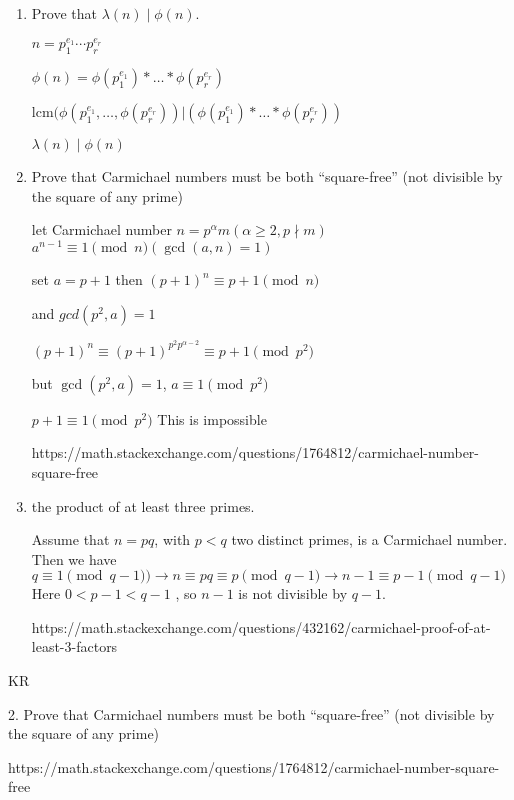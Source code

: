\begin{enumerate}
    \item  Prove that $\lambda(n) \mid \phi(n)$.
    
    $n = p_1^{e_1} \cdots p_r^{e_r}$

    $ \phi(n) = \phi(p_1^{e_1})* \ldots*\phi(p_r^{e_r})$

    $\text{lcm}(\phi(p_1^{e_1}, \ldots, \phi(p_r^{e_r})) | (\phi(p_1^{e_1})* \ldots*\phi(p_r^{e_r}))$
    
    $\lambda(n) \mid \phi(n)$

    \item  Prove that Carmichael numbers must be both “square-free” (not divisible by the square of any prime) 

    let Carmichael number $n = p^\alpha m( \alpha \ge 2 ,  p \nmid m )$
    $a^{n-1} \equiv 1 \pmod{n} (\gcd(a,n) = 1)$
    
    set $a = p+1 $ then $(p+1)^{n} \equiv p+1 \pmod{n}$
    
    and $gcd(p^2,a) = 1$
    
    $(p+1)^{n} \equiv (p+1)^{p^2 p^{\alpha-2}} \equiv p+1 \pmod{p^2}$
    
    but $\gcd(p^2,a) = 1$,  $ a \equiv 1 \pmod{p^2}$
    
    $p+1 \equiv 1 \pmod{p^2}$ This is impossible
    
    https://math.stackexchange.com/questions/1764812/carmichael-number-square-free


    
    \item  the product of at least three primes. 
    
    Assume that $n=pq$, with $p<q$ two distinct primes, is a Carmichael number. 
    Then we have 
    $q≡1 \pmod{q−1} )\rightarrow n \equiv pq \equiv p \pmod{q−1}  \rightarrow n−1 \equiv p−1 \pmod{q−1}$
    Here $0 < p−1 < q−1$ , so $n−1$ is not divisible by $q−1$.

    
    https://math.stackexchange.com/questions/432162/carmichael-proof-of-at-least-3-factors

\end{enumerate}



KR

2. Prove that Carmichael numbers must be both “square-free” (not divisible by the square of any prime) 

https://math.stackexchange.com/questions/1764812/carmichael-number-square-free


